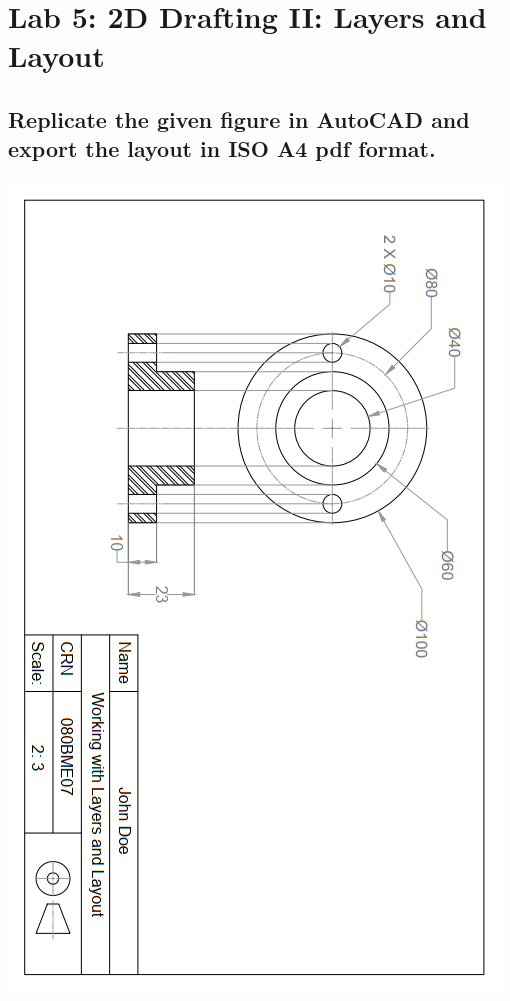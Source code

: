\documentclass[a4paper, 12pt]{article}
\begin{document}
\section{Lab 5: 2D Drafting II: Layers and Layout}
\subsection{Replicate the given figure in AutoCAD and export the layout in ISO A4 pdf format.}
\begin{center}
	\includegraphics[scale = 0.8]{gfx/l5t1.PNG}
\end{center}
\end{document}
